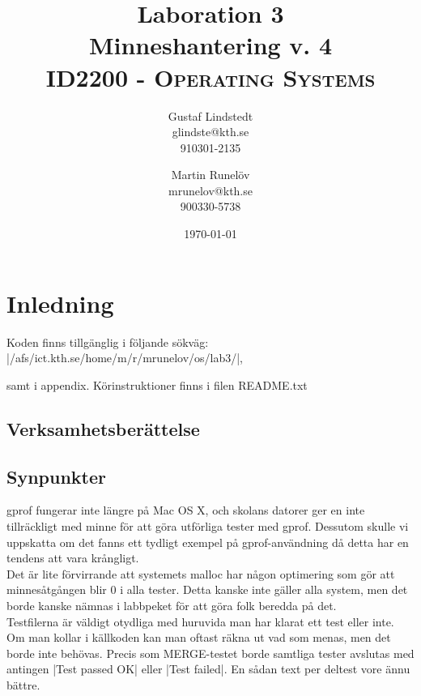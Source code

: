 \documentclass[paper=a4, fontsize=11pt]{scrartcl} %
\title{ 
\huge Laboration 3 \\ Minneshantering v. 4 \\ %
\vspace{10pt}
\normalfont \normalsize 
\textsc{ID2200 - Operating Systems } \\ [25pt] %
}
\author{Gustaf Lindstedt \\ glindste@kth.se \\ 910301-2135 \and Martin Runelöv \\ mrunelov@kth.se \\ 900330-5738}
\date{\vspace{8pt}\normalsize\today} %
\numberwithin{equation}{section} %
\numberwithin{figure}{section} %
\numberwithin{table}{section} %
\begin{document}
\maketitle

\section{Inledning}

Koden finns tillgänglig i följande sökväg: |/afs/ict.kth.se/home/m/r/mrunelov/os/lab3/|,

samt i appendix. Körinstruktioner finns i filen README.txt



\subsection{Verksamhetsberättelse}


\subsection{Synpunkter}
gprof fungerar inte längre på Mac OS X, och skolans datorer ger en inte tillräckligt med minne för att göra utförliga tester med gprof. Dessutom skulle vi uppskatta om det fanns ett tydligt exempel på gprof-användning då detta
har en tendens att vara krångligt.\\

Det är lite förvirrande att systemets malloc har någon optimering som gör att minnesåtgången blir 0 i alla tester. 
Detta kanske inte gäller alla system, men det borde kanske nämnas i labbpeket för att göra folk beredda på det.\\

Testfilerna är väldigt otydliga med huruvida man har klarat ett test eller inte. Om man kollar i källkoden kan man
oftast räkna ut vad som menas, men det borde inte behövas.
Precis som MERGE-testet borde samtliga tester avslutas med antingen |Test passed OK| eller |Test failed|.
En sådan text per deltest vore ännu bättre. 
\end{document}
